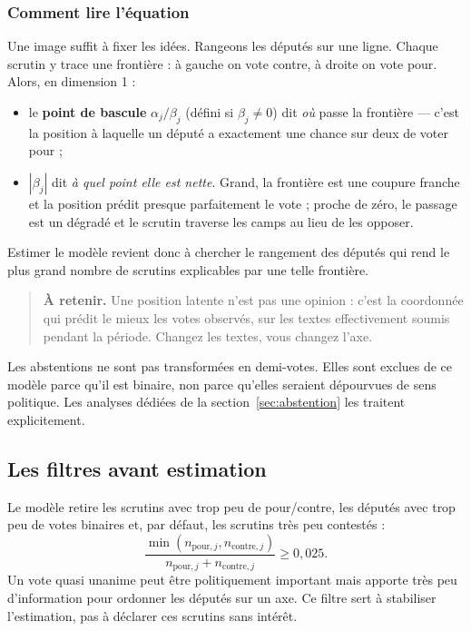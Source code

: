 \documentclass[11pt,a4paper]{article}
\newcommand{\important}[1]{\begin{quote}\small\color{blue!55!black}\textbf{À retenir.} #1\end{quote}}
\begin{document}
\subsubsection*{Comment lire l'équation}

Une image suffit à fixer les idées. Rangeons les députés sur une ligne. Chaque
scrutin y trace une frontière : à gauche on vote contre, à droite on vote pour.
Alors, en dimension 1 :

\begin{itemize}
  \item le \textbf{point de bascule} $\alpha_j/\beta_j$ (défini si
  $\beta_j\neq0$) dit \emph{où} passe la frontière — c'est la position à
  laquelle un député a exactement une chance sur deux de voter pour ;
  \item $|\beta_j|$ dit \emph{à quel point elle est nette}. Grand, la frontière
  est une coupure franche et la position prédit presque parfaitement le vote ;
  proche de zéro, le passage est un dégradé et le scrutin traverse les camps
  au lieu de les opposer.
\end{itemize}

Estimer le modèle revient donc à chercher le rangement des députés qui rend le
plus grand nombre de scrutins explicables par une telle frontière.

\important{Une position latente n'est pas une opinion : c'est la coordonnée qui
prédit le mieux les votes observés, sur les textes effectivement soumis pendant
la période. Changez les textes, vous changez l'axe.}

Les abstentions ne sont pas transformées en demi-votes. Elles sont exclues de
ce modèle parce qu'il est binaire, non parce qu'elles seraient dépourvues de
sens politique. Les analyses dédiées de la section~\ref{sec:abstention} les
traitent explicitement.

\subsection{Les filtres avant estimation}

Le modèle retire les scrutins avec trop peu de pour/contre, les députés avec
trop peu de votes binaires et, par défaut, les scrutins très peu contestés :
\[
 \frac{\min(n_{\mathrm{pour},j},n_{\mathrm{contre},j})}
 {n_{\mathrm{pour},j}+n_{\mathrm{contre},j}}\geq0{,}025.
\]
Un vote quasi unanime peut être politiquement important mais apporte très peu
d'information pour ordonner les députés sur un axe. Ce filtre sert à stabiliser
l'estimation, pas à déclarer ces scrutins sans intérêt.
\end{document}
